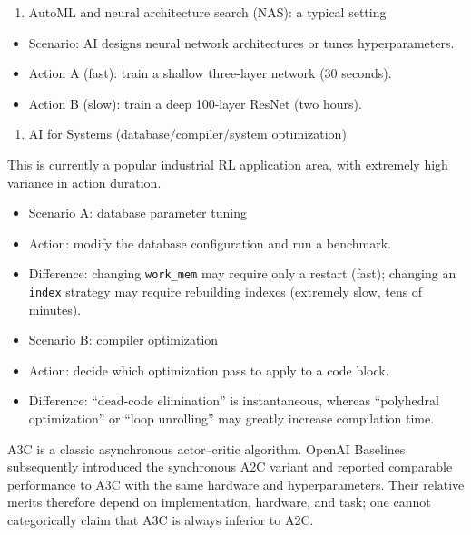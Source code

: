 \begin{enumerate}
\def\labelenumi{\arabic{enumi}.}
\tightlist
\item
  AutoML and neural architecture search (NAS): a typical setting
\end{enumerate}

\begin{itemize}
\tightlist
\item
  Scenario: AI designs neural network architectures or tunes hyperparameters.
\item
  Action A (fast): train a shallow three-layer network (30 seconds).
\item
  Action B (slow): train a deep 100-layer ResNet (two hours).
\end{itemize}

\begin{enumerate}
\def\labelenumi{\arabic{enumi}.}
\setcounter{enumi}{1}
\tightlist
\item
  AI for Systems (database/compiler/system optimization)
\end{enumerate}

This is currently a popular industrial RL application area, with extremely high variance in action duration.

\begin{itemize}
\tightlist
\item
  Scenario A: database parameter tuning
\item
  Action: modify the database configuration and run a benchmark.
\item
  Difference: changing \texttt{work\_mem} may require only a restart (fast); changing an \texttt{index} strategy may require rebuilding indexes (extremely slow, tens of minutes).
\item
  Scenario B: compiler optimization
\item
  Action: decide which optimization pass to apply to a code block.
\item
  Difference: ``dead-code elimination'' is instantaneous, whereas ``polyhedral optimization'' or ``loop unrolling'' may greatly increase compilation time.
\end{itemize}

A3C is a classic asynchronous actor--critic algorithm. OpenAI Baselines subsequently introduced the synchronous A2C variant and reported comparable performance to A3C with the same hardware and hyperparameters. Their relative merits therefore depend on implementation, hardware, and task; one cannot categorically claim that A3C is always inferior to A2C.

